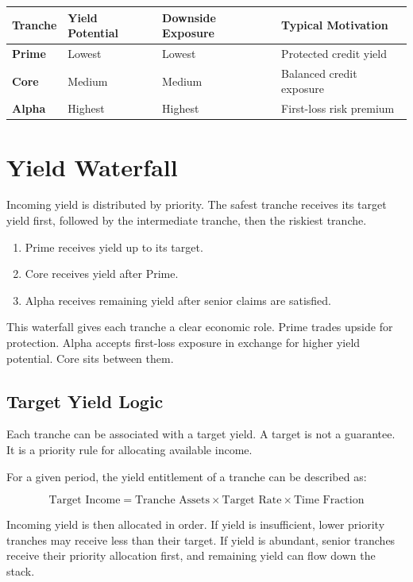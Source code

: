 \documentclass[11pt]{article}
\begin{document}
\begin{center}
\begin{tabular}{>{\bfseries}p{}p{}p{}p{}}
\toprule
Tranche & Yield Potential & Downside Exposure & Typical Motivation \\
\midrule
Prime & Lowest & Lowest & Protected credit yield \\
Core & Medium & Medium & Balanced credit exposure \\
Alpha & Highest & Highest & First-loss risk premium \\
\bottomrule
\end{tabular}
\end{center}

\section{Yield Waterfall}

Incoming yield is distributed by priority. The safest tranche receives its target
yield first, followed by the intermediate tranche, then the riskiest tranche.

\begin{enumerate}
  \item Prime receives yield up to its target.
  \item Core receives yield after Prime.
  \item Alpha receives remaining yield after senior claims are satisfied.
\end{enumerate}

This waterfall gives each tranche a clear economic role. Prime trades upside for
protection. Alpha accepts first-loss exposure in exchange for higher yield
potential. Core sits between them.

\subsection{Target Yield Logic}

Each tranche can be associated with a target yield. A target is not a guarantee.
It is a priority rule for allocating available income.

For a given period, the yield entitlement of a tranche can be described as:

\[
\text{Target Income} =
\text{Tranche Assets} \times \text{Target Rate} \times \text{Time Fraction}
\]

Incoming yield is then allocated in order. If yield is insufficient, lower
priority tranches may receive less than their target. If yield is abundant,
senior tranches receive their priority allocation first, and remaining yield can
flow down the stack.
\end{document}

